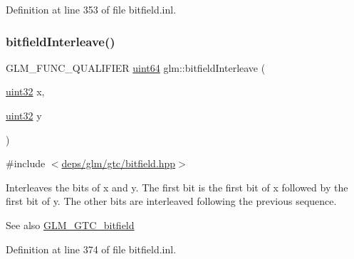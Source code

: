 Definition at line 353 of file bitfield.\+inl.

\mbox{\label{group__gtc__bitfield_ga2bc87fd66f6f8471c1a46888360cef12}} 
\subsubsection{\texorpdfstring{bitfield\+Interleave()}{bitfieldInterleave()}\hspace{0.1cm}{\footnotesize\ttfamily [6/16]}}
{\footnotesize\ttfamily G\+L\+M\+\_\+\+F\+U\+N\+C\+\_\+\+Q\+U\+A\+L\+I\+F\+I\+ER \hyperlink{group__gtc__type__precision_gae3632bf9b37da66233d78930dd06378a}{uint64} glm\+::bitfield\+Interleave (\begin{DoxyParamCaption}\item[{\hyperlink{group__gtc__type__precision_ga202b6a53c105fcb7e531f9b443518451}{uint32}}]{x,  }\item[{\hyperlink{group__gtc__type__precision_ga202b6a53c105fcb7e531f9b443518451}{uint32}}]{y }\end{DoxyParamCaption})}



{\ttfamily \#include $<$\hyperlink{bitfield_8hpp}{deps/glm/gtc/bitfield.\+hpp}$>$}

Interleaves the bits of x and y. The first bit is the first bit of x followed by the first bit of y. The other bits are interleaved following the previous sequence.

\begin{DoxySeeAlso}{See also}
\hyperlink{group__gtc__bitfield}{G\+L\+M\+\_\+\+G\+T\+C\+\_\+bitfield} 
\end{DoxySeeAlso}


Definition at line 374 of file bitfield.\+inl.

\mbox{\label{group__gtc__bitfield_ga6dee2ce1c45805063bb7fc5f6fd8f5ca}} 
